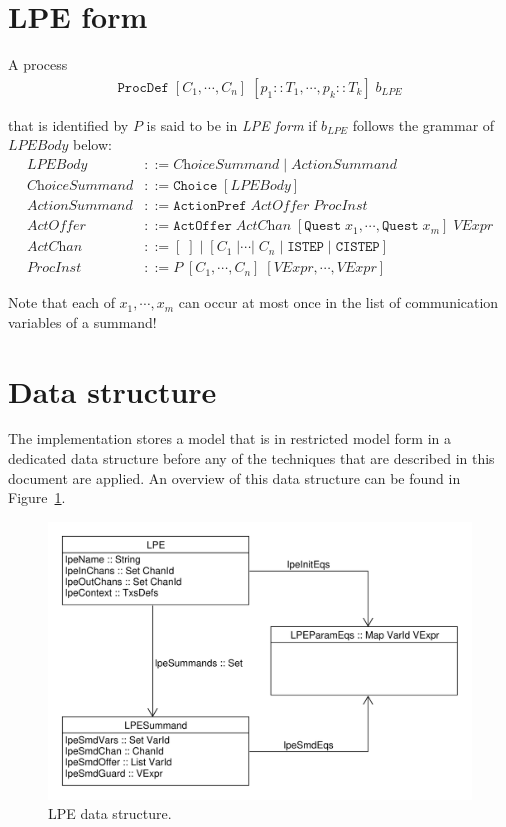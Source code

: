 \section{LPE form} \label{sec:lpeform}

A \txs{} process
\begin{align*}
\texttt{ProcDef} \; [C_1, \cdots{}, C_n] \; [p_1 :: T_1, \cdots{}, p_k :: T_k] \; b_\textit{LPE}
\end{align*}

that is identified by $P$ is said to be in \emph{LPE form} if $b_\textit{LPE}$ follows the grammar of $\textit{LPEBody}$ below:
\begin{align*}
\textit{LPEBody} &::= \textit{ChoiceSummand} \;|\; \textit{ActionSummand} \\
\textit{ChoiceSummand} &::= \texttt{Choice} \; [ \textit{LPEBody} ] \\
\textit{ActionSummand} &::= \texttt{ActionPref} \; \textit{ActOffer} \; \textit{ProcInst} \\
\textit{ActOffer} &::= \texttt{ActOffer} \; \textit{ActChan} \; [\texttt{Quest} \; x_1, \cdots{}, \texttt{Quest} \; x_m] \; \textit{VExpr} \\
\textit{ActChan} &::= [\;] \;|\; [C_1 \;| \cdots{} |\; C_n \;|\; \texttt{ISTEP} \;|\; \texttt{CISTEP}] \\
\textit{ProcInst} &::= P \; [C_1, \cdots{}, C_n] \; [ \textit{VExpr}, \cdots{}, \textit{VExpr} ]
\end{align*}

Note that each of $x_1, \cdots{}, x_m$ can occur at most once in the list of communication variables of a summand!

\section{Data structure}

The implementation stores a \txs{} model that is in restricted model form in a dedicated data structure before any of the techniques that are described in this document are applied.
An overview of this data structure can be found in Figure~\ref{fig:lpedatastructure}.

\begin{figure}[!ht]
\begin{center}
\includegraphics[width=0.7\linewidth]{images/lpe-types}
\caption{LPE data structure.}
\label{fig:lpedatastructure}
\end{center}
\end{figure}

